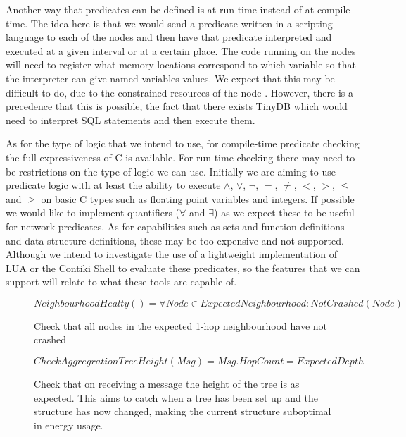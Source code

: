 \documentclass[a4paper]{article}
\begin{document}
Another way that predicates can be defined is at run-time instead of at
compile-time. The idea here is that we would send a predicate written in a
scripting language to each of the nodes and then have that predicate interpreted
and executed at a given interval or at a certain place. The code running on the
nodes will need to register what memory locations correspond to which variable
so that the interpreter can give named variables values. We expect that this may
be difficult to do, due to the constrained resources of the node \cite{CM5000}.
However, there is a precedence that this is possible, the fact that there exists
TinyDB \cite{?} which would need to interpret SQL statements and then execute
them.

As for the type of logic that we intend to use, for compile-time predicate
checking the full expressiveness of C is available. For run-time checking there
may need to be restrictions on the type of logic we can use. Initially we are
aiming to use predicate logic with at least the ability to execute $\land$,
$\lor$, $\lnot$, $=$, $\neq$, $<$, $>$, $\leq$ and $\geq$ on basic C types such
as floating point variables and integers. If possible we would like to implement
quantifiers ($\forall$ and $\exists$) as we expect these to be useful for
network predicates. As for capabilities such as sets and function definitions
and data structure definitions, these may be too expensive and not supported.
Although we intend to investigate the use of a lightweight implementation of LUA
\cite{?} or the Contiki Shell \cite{?} to evaluate these predicates, so the
features that we can support will relate to what these tools are capable of.

\begin{figure}[H]
\begin{center}
    \begin{displaymath}
	NeighbourhoodHealty() = \forall Node \in ExpectedNeighbourhood :
NotCrashed(Node)
	\end{displaymath}
	\caption{Check that all nodes in the expected 1-hop neighbourhood have
not crashed}
\end{center}
\end{figure}

\begin{figure}[H]
\begin{center}
    \begin{displaymath}
	CheckAggregrationTreeHeight(Msg) = Msg.HopCount = ExpectedDepth
	\end{displaymath}
	\caption{Check that on receiving a message the height of the tree is as
expected. This aims to catch when a tree has been set up and the structure has
now changed, making the current structure suboptimal in energy usage.}
\end{center}
\end{figure}
\end{document}
